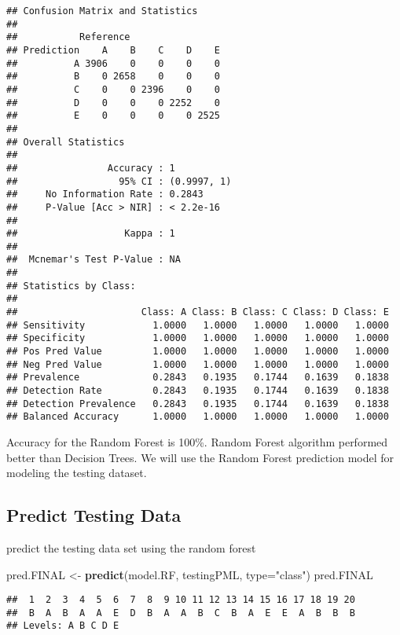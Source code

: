 \documentclass[
]{article}
\newenvironment{Shaded}{\begin{snugshade}}{\end{snugshade}}
\newcommand{\DataTypeTok}[1]{\textcolor[rgb]{0.13,0.29,0.53}{#1}}
\newcommand{\KeywordTok}[1]{\textcolor[rgb]{0.13,0.29,0.53}{\textbf{#1}}}
\newcommand{\NormalTok}[1]{#1}
\newcommand{\StringTok}[1]{\textcolor[rgb]{0.31,0.60,0.02}{#1}}
\begin{document}
\begin{verbatim}
## Confusion Matrix and Statistics
## 
##           Reference
## Prediction    A    B    C    D    E
##          A 3906    0    0    0    0
##          B    0 2658    0    0    0
##          C    0    0 2396    0    0
##          D    0    0    0 2252    0
##          E    0    0    0    0 2525
## 
## Overall Statistics
##                                      
##                Accuracy : 1          
##                  95% CI : (0.9997, 1)
##     No Information Rate : 0.2843     
##     P-Value [Acc > NIR] : < 2.2e-16  
##                                      
##                   Kappa : 1          
##                                      
##  Mcnemar's Test P-Value : NA         
## 
## Statistics by Class:
## 
##                      Class: A Class: B Class: C Class: D Class: E
## Sensitivity            1.0000   1.0000   1.0000   1.0000   1.0000
## Specificity            1.0000   1.0000   1.0000   1.0000   1.0000
## Pos Pred Value         1.0000   1.0000   1.0000   1.0000   1.0000
## Neg Pred Value         1.0000   1.0000   1.0000   1.0000   1.0000
## Prevalence             0.2843   0.1935   0.1744   0.1639   0.1838
## Detection Rate         0.2843   0.1935   0.1744   0.1639   0.1838
## Detection Prevalence   0.2843   0.1935   0.1744   0.1639   0.1838
## Balanced Accuracy      1.0000   1.0000   1.0000   1.0000   1.0000
\end{verbatim}

Accuracy for the Random Forest is 100\%. Random Forest algorithm
performed better than Decision Trees. We will use the Random Forest
prediction model for modeling the testing dataset.

\hypertarget{predict-testing-data}{%
\subsection{Predict Testing Data}\label{predict-testing-data}}

predict the testing data set using the random forest

\begin{Shaded}
\begin{Highlighting}[]
\NormalTok{pred.FINAL <-}\StringTok{ }\KeywordTok{predict}\NormalTok{(model.RF, testingPML, }\DataTypeTok{type=}\StringTok{"class"}\NormalTok{)}
\NormalTok{pred.FINAL}
\end{Highlighting}
\end{Shaded}

\begin{verbatim}
##  1  2  3  4  5  6  7  8  9 10 11 12 13 14 15 16 17 18 19 20 
##  B  A  B  A  A  E  D  B  A  A  B  C  B  A  E  E  A  B  B  B 
## Levels: A B C D E
\end{verbatim}
\end{document}
